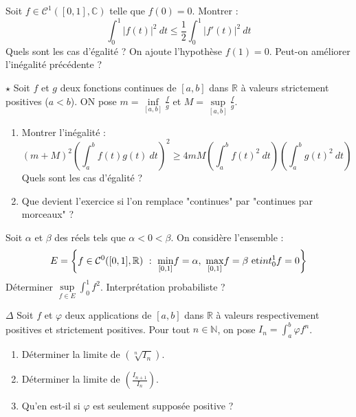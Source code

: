 \documentclass[french,a4paper]{article}
\newcommand{\N}{\mathbb{N}}
\newcommand{\R}{\mathbb{R}}
\newcommand{\C}{\mathbb{C}}
\theoremstyle{plain}
\theoremstyle{definition}
\theoremstyle{remark}
\begin{document}
\begin{ex}[Moulin.IG.08]{}
	Soit $f\in\mathcal{C}^1([0,1],\C)$ telle que $f(0)=0$. Montrer : $$\int_{0}^{1}\lvert f(t)\rvert^2\ dt\leqslant\frac{1}{2}\int_{0}^{1}\lvert f'(t)\rvert^2\ dt$$ Quels sont les cas d'égalité ? On ajoute l'hypothèse $f(1)=0$. Peut-on améliorer l'inégalité précédente ?
\end{ex}

\begin{ex}[Moulin.IG.09]{$\star$}
	Soit $f$ et $g$ deux fonctions continues de $[a,b]$ dans $\R$ à valeurs strictement positives ($a<b$). ON pose $m=\displaystyle\underset{[a,b]}{\inf}\frac{f}{g}$ et $M=\displaystyle\underset{[a,b]}{\sup}\frac{f}{g}$.
	\begin{enumerate}
		\item Montrer l'inégalité : $$(m+M)^2\left(\int_{a}^{b}f(t)g(t)\ dt\right)^2\geqslant 4mM\left(\int_{a}^{b}f(t)^2\ dt\right)\left(\int_{a}^{b}g(t)^2\ dt\right)$$ Quels sont les cas d'égalité ?
		\item Que devient l'exercice si l'on remplace "continues" par "continues par morceaux" ?
	\end{enumerate}
\end{ex}

\begin{ex}[Moulin.IG.10]{}
	Soit $\alpha$ et $\beta$ des réels tels que $\alpha<0<\beta$. On considère l'ensemble : $$E=\left\{f\in\mathcal{C}^0([0,1],\R)\ : \ \underset{[0,1]}{\min}f=\alpha,\ \underset{[0,1]}{\max}f=\beta\ \text{et}\\int_{0}^{1}f=0 \right\}$$ Déterminer $\displaystyle\underset{f\in E}{\sup}\int_{0}^{1}f^2$. Interprétation probabiliste ?
\end{ex}

\begin{ex}[Moulin.IG.11]{$\Delta$}
	Soit $f$ et $\varphi$ deux applications de $[a,b]$ dans $\R$ à valeurs respectivement positives et strictement positives. Pour tout $n\in\N$, on pose $I_n=\displaystyle\int_{a}^{b}\varphi f^n$.
	\begin{enumerate}
		\item Déterminer la limite de $(\sqrt[n]{I_n})$.
		\item Déterminer la limite de $\displaystyle\left(\frac{I_{n+1}}{I_n}\right)$.
		\item Qu'en est-il si $\varphi$ est seulement supposée positive ?
	\end{enumerate}
\end{ex}
\end{document}

